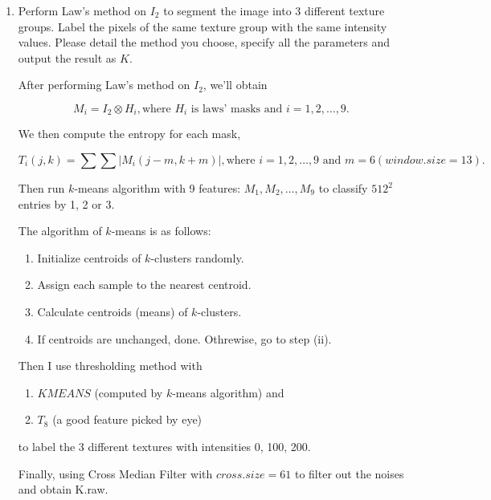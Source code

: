 \documentclass{article}
\begin{document}
    \begin{enumerate}[label=(\alph*)]
        \item Perform Law's method on $I_2$ to segment the image into 3 different texture groups. Label the pixels of the same texture group with the same intensity values. Please detail the method you choose, specify all the parameters and output the result as $K$.
        
        After performing Law's method on $I_2$, we'll obtain
        
        $$M_i = I_2 \otimes H_i, \text{where $H_i$ is laws' masks and } i = 1, 2, \dots, 9.$$

        We then compute the entropy for each mask,
        
        $$T_i(j, k) = \sum\sum |M_i(j - m, k + m)|, \text{where } i = 1, 2, \dots, 9 \text{ and } m = 6 (window.size = 13).$$

        Then run $k$-means algorithm with 9 features: $M_1, M_2, \dots, M_9$ to classify $512^2$ entries by 1, 2 or 3.

        The algorithm of $k$-means is as follows:

        \begin{enumerate}[label=(\roman*)]
            \item Initialize centroids of $k$-clusters randomly.
            \item Assign each sample to the nearest centroid.
            \item Calculate centroids (means) of $k$-clusters.
            \item If centroids are unchanged, done. Othrewise, go to step (ii).
        \end{enumerate}

        Then I use thresholding method with 
        
        \begin{enumerate}[label=(\roman*)]
            \item $KMEANS$ (computed by $k$-means algorithm) and 
            \item $T_8$ (a good feature picked by eye)
        \end{enumerate}
        
        to label the 3 different textures with intensities 0, 100, 200.

        Finally, using Cross Median Filter with $cross.size = 61$ to filter out the noises and obtain K.raw.


\end{enumerate}
\end{document}
